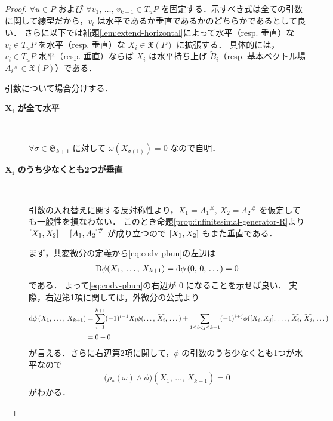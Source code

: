 \documentclass[TQFT_main]{subfiles}
\begin{document}
\begin{proof}
    $\forall u \in P$ および $\forall v_1,\, \dots,\, v_{k+1} \in T_u P$ を固定する．示すべき式は全ての引数に関して線型だから，$v_i$ は水平であるか垂直であるかのどちらかであるとして良い．
    さらに以下では補題\ref{lem:extend-horizontal}によって水平（resp. 垂直）な $v_i \in T_u P$ を水平（resp. 垂直）な $X_i \in \mathfrak{X}(P)$ に拡張する．
    具体的には，$v_i \in T_u P$ 水平（resp. 垂直）ならば $X_i$ は\hyperref[def:horizontal-lift-vecf]{水平持ち上げ} $\tilde{B}_i$（resp. \hyperref[def:fundamental-vecf]{基本ベクトル場} $A_i{}^\# \in \mathfrak{X}(P)$）である．
    
    引数について場合分けする．
    \begin{description}
        \item[\textbf{$\bm{X_i}$ が全て水平}]　
        
        $\forall \sigma \in \mathfrak{S}_{k+1}$ に対して $\omega(X_{\sigma(1)}) = 0$ なので自明．

        \item[\textbf{$\bm{X_i}$ のうち少なくとも2つが垂直}]　
        
        引数の入れ替えに関する反対称性より，$X_1 = A_1{}^\#,\, X_2 = A_2{}^\#$ を仮定しても一般性を損なわない．
        このとき命題\ref{prop:infinitesimal-generator-R}より $\comm{X_1}{X_2} = \comm{A_1}{A_2}^\#$ が成り立つので $\comm{X_1}{X_2}$ もまた垂直である．
        
        まず，共変微分の定義から\eqref{eq:codv-pbun}の左辺は
        \begin{align}
            \mathrm{D}\phi(X_1,\, \dots,\, X_{k+1}) = \dd{\phi}(0,\, 0,\, \dots) = 0
        \end{align}
        である．
        よって\eqref{eq:codv-pbun}の右辺が $0$ になることを示せば良い．
        実際，右辺第1項に関しては，外微分の公式より
        \begin{align}
            \dd{\phi}(X_1,\, \dots,\, X_{k+1})
            &= \sum_{i=1}^{k+1} (-1)^{i-1} X_i \phi(\dots,\, \widehat{X_i},\, \dots) 
            + \sum_{1 \le i < j \le k+1} (-1)^{i+j} \phi(\comm{X_i}{X_j},\, \dots,\, \widehat{X_i},\, \widehat{X_j},\, \dots) \label{eq:extdv-global} \\
            &= 0 + 0
        \end{align}
        が言える．さらに右辺第2項に関して，$\phi$ の引数のうち少なくとも1つが水平なので
        \begin{align}
            \bigl(\rho_* (\omega) \wedge \phi\bigr) (X_1,\, \dots,\, X_{k+1}) = 0
        \end{align}
        がわかる．


\end{description}
\end{proof}
\end{document}
